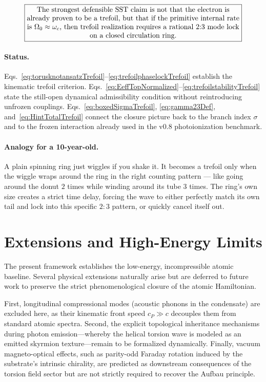 \documentclass[11pt,a4paper]{article}
\newcommand{\boxedstatement}[1]{\fbox{\parbox{0.86\linewidth}{\centering #1}}}
\begin{document}
\begin{equation}
\boxedstatement{The strongest defensible SST claim is not that the electron is already proven to be a trefoil, but that if the primitive internal rate is $\Omega_0 \approx \omega_c$, then trefoil realization requires a rational $2{:}3$ mode lock on a closed circulation ring.}
\label{eq:boxedStrongestClaim}
\end{equation}

\paragraph{Status.}
Eqs.~\eqref{eq:torusknotansatzTrefoil}--\eqref{eq:trefoilphaselockTrefoil} establish the kinematic trefoil criterion. Eqs.~\eqref{eq:EeffTopNormalized}--\eqref{eq:trefoilstabilityTrefoil} state the still-open dynamical admissibility condition without reintroducing unfrozen couplings. Eqs.~\eqref{eq:boxedSigmaTrefoil}, \eqref{eq:gamma23Def}, and~\eqref{eq:HintTotalTrefoil} connect the closure picture back to the branch index \(\sigma\) and to the frozen interaction already used in the v0.8 photoionization benchmark.

\paragraph{Analogy for a 10-year-old.}
A plain spinning ring just wiggles if you shake it. It becomes a trefoil only when the wiggle wraps around the ring in the right counting pattern --- like going around the donut \(2\) times while winding around its tube \(3\) times. The ring's own size creates a strict time delay, forcing the wave to either perfectly match its own tail and lock into this specific $2{:}3$ pattern, or quickly cancel itself out.

\section{Extensions and High-Energy Limits}
The present framework establishes the low-energy, incompressible atomic baseline. Several physical extensions naturally arise but are deferred to future work to preserve the strict phenomenological closure of the atomic Hamiltonian.

First, longitudinal compressional modes (acoustic phonons in the condensate) are excluded here, as their kinematic front speed $c_P \gg c$ decouples them from standard atomic spectra. Second, the explicit topological inheritance mechanisms during photon emission---whereby the helical torsion wave is modeled as an emitted skyrmion texture---remain to be formalized dynamically. Finally, vacuum magneto-optical effects, such as parity-odd Faraday rotation induced by the substrate's intrinsic chirality, are predicted as downstream consequences of the torsion field sector but are not strictly required to recover the Aufbau principle.
\end{document}
